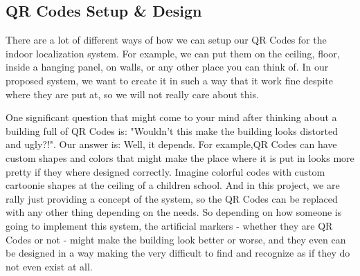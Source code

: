 \subsection{QR Codes Setup \& Design}

There are a lot of different ways of how we can setup our QR Codes for the indoor localization system. For example, we can put them on the ceiling, floor, inside a hanging panel, on walls, or any other place you can think of. In our proposed system, we want to create it in such a way that it work fine despite where they are put at, so we will not really care about this.

One significant question that might come to your mind after thinking about a building full of QR Codes is: "Wouldn't this make the building looks distorted and ugly?!". Our answer is: Well, it depends. For example,QR Codes can have custom shapes and colors that might make the place where it is put in looks more pretty if they where designed correctly. Imagine colorful codes with custom cartoonie shapes at the ceiling of a children school. And in this project, we are rally just providing a concept of the system, so the QR Codes can be replaced with any other thing depending on the needs. So depending on how someone is going to implement this system, the artificial markers - whether they are QR Codes or not - might make the building look better or worse, and they even can be designed in a way making the very difficult to find and recognize as if they do not even exist at all.